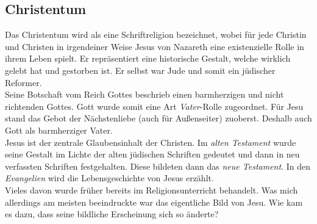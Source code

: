 \subsection*{Christentum}
Das Christentum wird als eine Schriftreligion bezeichnet, wobei für jede Christin und Christen in irgendeiner Weise Jesus von Nazareth eine existenzielle Rolle in ihrem Leben spielt. Er repräsentiert eine historische Gestalt, welche wirklich gelebt hat und gestorben ist. Er selbst war Jude und somit ein jüdischer Reformer.\\

Seine Botschaft vom Reich Gottes beschrieb einen barmherzigen und nicht richtenden Gottes. Gott wurde somit eine Art \textit{Vater}-Rolle zugeordnet. Für Jesu stand das Gebot der Nächstenliebe (auch für Außenseiter) zuoberst. Deshalb auch Gott als barmherziger Vater.\\

Jesus ist der zentrale Glaubensinhalt der Christen. Im \textit{alten Testament} wurde seine Gestalt im Lichte der alten jüdischen Schriften gedeutet und dann in neu verfassten Schriften festgehalten. Diese bildeten dann das \textit{neue Testament}. In den \textit{Evangelien} wird die Lebensgeschichte von Jesus erzählt.\\

Vieles davon wurde früher bereits im Religionsunterricht behandelt. Was mich allerdings am meisten beeindruckte war das eigentliche Bild von Jesu. Wie kam es dazu, dass seine bildliche Erscheinung sich so änderte?\\

